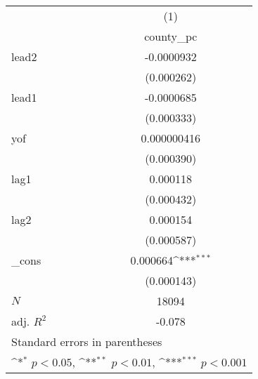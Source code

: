 {
\def\sym#1{\ifmmode^{#1}\else\(^{#1}\)\fi}
\begin{tabular}{l*{1}{c}}
\hline\hline
            &\multicolumn{1}{c}{(1)}\\
            &\multicolumn{1}{c}{county\_pc}\\
\hline
lead2       &  -0.0000932         \\
            &  (0.000262)         \\
[1em]
lead1       &  -0.0000685         \\
            &  (0.000333)         \\
[1em]
yof         & 0.000000416         \\
            &  (0.000390)         \\
[1em]
lag1        &    0.000118         \\
            &  (0.000432)         \\
[1em]
lag2        &    0.000154         \\
            &  (0.000587)         \\
[1em]
\_cons      &    0.000664\sym{***}\\
            &  (0.000143)         \\
\hline
\(N\)       &       18094         \\
adj. \(R^{2}\)&      -0.078         \\
\hline\hline
\multicolumn{2}{l}{\footnotesize Standard errors in parentheses}\\
\multicolumn{2}{l}{\footnotesize \sym{*} \(p<0.05\), \sym{**} \(p<0.01\), \sym{***} \(p<0.001\)}\\
\end{tabular}
}
